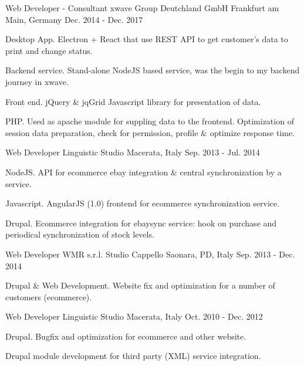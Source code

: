 \begin{cventries}
  \cventry
    {Web Developer - Consultant} %
    {xwave Group Deutchland GmbH} %
    {Frankfurt am Main, Germany} %
    {Dec. 2014 - Dec. 2017} %
    {
      \begin{cvitems}
        \item {Desktop App. Electron + React that use REST API to get customer's data to print and change status.}
        \item {Backend service. Stand-alone NodeJS based service, was the begin to my backend journey in xwave.}
        \item {Front end. jQuery \& jqGrid Javascript library for presentation of data.}
        \item {PHP. Used as apache module for suppling data to the frontend. Optimization of session data preparation, check for permission, profile \& optimize response time.}
      \end{cvitems}
    }

  \cventry
    {Web Developer} %
    {Linguistic Studio} %
    {Macerata, Italy} %
    {Sep. 2013 - Jul. 2014} %
    {
      \begin{cvitems} %
        \item {NodeJS. API for ecommerce ebay integration \& central synchronization by a service.}
        \item {Javascript. AngularJS (1.0) frontend for ecommerce synchronization service.}
        \item {Drupal. Ecommerce integration for ebaysync service: hook on purchase and periodical synchronization of stock levels.}
      \end{cvitems}
    }

  \cventry
    {Web Developer} %
    {WMR s.r.l. Studio Cappello} %
    {Saonara, PD, Italy} %
    {Sep. 2013 - Dec. 2014} %
    {
      \begin{cvitems} %
        \item {Drupal \& Web Development. Website fix and optimization for a number of customers (ecommerce).}
      \end{cvitems}
    }

  \cventry
    {Web Developer} %
    {Linguistic Studio} %
    {Macerata, Italy} %
    {Oct. 2010 - Dec. 2012} %
    {
      \begin{cvitems} %
        \item {Drupal. Bugfix and optimization for ecommerce and other website.}
        \item {Drupal module development for third party (XML) service integration.}
      \end{cvitems}
    }


\end{cventries}
